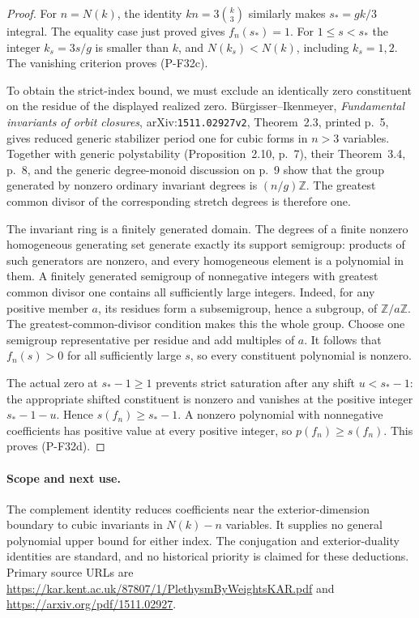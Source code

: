 \begin{proof}
For $n=N(k)$, the identity $kn=3\binom k3$ similarly
makes $s_*=gk/3$ integral. The equality case just proved
gives $f_n(s_*)=1$. For $1\le s<s_*$ the integer
$k_s=3s/g$ is smaller than $k$, and $N(k_s)<N(k)$,
including $k_s=1,2$. The vanishing criterion proves
(P-F32c).

To obtain the strict-index bound, we must exclude an
identically zero constituent on the residue of the
displayed realized zero. B\"urgisser--Ikenmeyer,
\emph{Fundamental invariants of orbit closures},
arXiv:\texttt{1511.02927v2}, Theorem~2.3, printed p.~5,
gives reduced generic stabilizer period one for cubic
forms in $n>3$ variables. Together with generic polystability
(Proposition~2.10, p.~7), their Theorem~3.4, p.~8, and
the generic degree-monoid discussion on p.~9 show that
the group generated by nonzero ordinary invariant
degrees is $(n/g)\mathbb Z$. The greatest common divisor
of the corresponding stretch degrees is therefore one.

The invariant ring is a finitely generated domain.
The degrees of a finite nonzero homogeneous generating
set generate exactly its support semigroup: products
of such generators are nonzero, and every homogeneous
element is a polynomial in them. A finitely generated
semigroup of nonnegative integers with greatest common
divisor one contains all sufficiently large integers.
Indeed, for any positive member $a$, its residues form
a subsemigroup, hence a subgroup, of $\mathbb Z/a\mathbb Z$.
The greatest-common-divisor condition makes this the
whole group. Choose one semigroup representative per
residue and add multiples of $a$.
It follows that $f_n(s)>0$ for all sufficiently large
$s$, so every constituent polynomial is nonzero.

The actual zero at $s_*-1\ge1$ prevents strict saturation
after any shift $u<s_*-1$: the appropriate shifted
constituent is nonzero and vanishes at the positive
integer $s_*-1-u$. Hence $s(f_n)\ge s_*-1$.
A nonzero polynomial with nonnegative coefficients
has positive value at every positive integer, so
$p(f_n)\ge s(f_n)$. This proves (P-F32d).
\end{proof}

\paragraph{Scope and next use.}
The complement identity reduces coefficients near the
exterior-dimension boundary to cubic invariants in
$N(k)-n$ variables. It supplies no general polynomial
upper bound for either index. The conjugation and
exterior-duality identities are standard, and no
historical priority is claimed for these deductions.
Primary source URLs are
\url{https://kar.kent.ac.uk/87807/1/PlethysmByWeightsKAR.pdf}
and \url{https://arxiv.org/pdf/1511.02927}.


